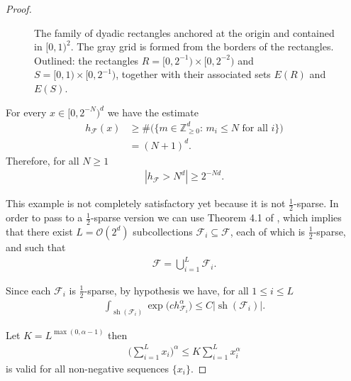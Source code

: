 \documentclass[oneside]{amsart}
\theoremstyle{definition}
\theoremstyle{plain}
\numberwithin{equation}{section}
\numberwithin{theorem}{section}
\newcommand{\sh}{\operatorname{sh}}
\begin{document}
\begin{proof}
\begin{figure}[htpb!]
    \caption{
      The family of dyadic rectangles anchored at the origin and contained in
      $[0,1)^2$.
      The gray grid is formed from the borders of the rectangles.
      Outlined: the rectangles
      $R = [0,2^{-1}) \times [0,2^{-2})$
      and $S = [0,1) \times [0,2^{-1})$,
      together with their associated sets $E(R)$ and $E(S)$.
    }
    \label{figure:chains_example}
  \end{figure}

  For every $x \in [0,2^{-N})^d$ we have the estimate
  \begin{align*}
    h_{\mathcal{F}}(x) &\geq \#\big(\big\{m \in \mathbb{Z}_{\geq 0}^d:\,
    m_i \leq N \text{ for all $i$} \big\}\big) \\
    &= (N+1)^d.
  \end{align*}
  Therefore, for all $N \geq 1$
  \begin{align}
    \label{sharp1:level_set_eta_sparse}
    |h_{\mathcal{F}} > N^d| \geq 2^{-Nd}.
  \end{align}

  This example is not completely satisfactory yet because it is not
  $\frac{1}{2}$-sparse.
  In order to pass to a $\frac{1}{2}$-sparse version we can use Theorem 4.1 of
  \cite{Rey2024}, which implies that there exist $L = \mathcal{O}(2^d)$
  subcollections $\mathcal{F}_i \subseteq \mathcal{F}$, each of which is
  $\frac{1}{2}$-sparse, and such that
  \begin{align*}
    \mathcal{F} = \bigcup_{i=1}^L \mathcal{F}_i.
  \end{align*}

  Since each $\mathcal{F}_i$ is $\frac{1}{2}$-sparse, by hypothesis we have, for
  all $1 \leq i \leq L$
  \begin{align*}
    \int_{\sh(\mathcal{F}_i)} \exp\big( c h_{\mathcal{F}_i}^\alpha \big)
    \leq C |\sh(\mathcal{F}_i)|.
  \end{align*}

  Let $K = L^{\max(0,\alpha-1)}$ then
  \begin{align} \label{sharp1:quasi}
    \bigg( \sum_{i=1}^L x_i \bigg)^\alpha \leq K \sum_{i=1}^L x_i^\alpha
  \end{align}
  is valid for all non-negative sequences $\{x_i\}$.


\end{proof}
\end{document}
